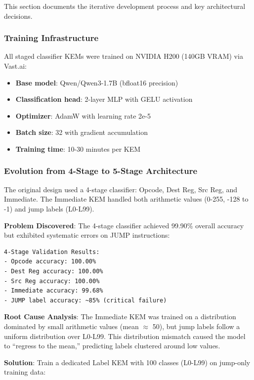 \documentclass[11pt]{article}
\begin{document}
This section documents the iterative development process and key architectural decisions.

\subsubsection{Training Infrastructure}

All staged classifier KEMs were trained on NVIDIA H200 (140GB VRAM) via Vast.ai:

\begin{itemize}
    \item \textbf{Base model}: Qwen/Qwen3-1.7B (bfloat16 precision)
    \item \textbf{Classification head}: 2-layer MLP with GELU activation
    \item \textbf{Optimizer}: AdamW with learning rate 2e-5
    \item \textbf{Batch size}: 32 with gradient accumulation
    \item \textbf{Training time}: 10-30 minutes per KEM
\end{itemize}

\subsubsection{Evolution from 4-Stage to 5-Stage Architecture}

The original design used a 4-stage classifier: Opcode, Dest Reg, Src Reg, and Immediate. The Immediate KEM handled both arithmetic values (0-255, -128 to -1) and jump labels (L0-L99).

\textbf{Problem Discovered}: The 4-stage classifier achieved 99.90\% overall accuracy but exhibited systematic errors on JUMP instructions:

\begin{lstlisting}
4-Stage Validation Results:
- Opcode accuracy: 100.00%
- Dest Reg accuracy: 100.00%
- Src Reg accuracy: 100.00%
- Immediate accuracy: 99.68%
- JUMP label accuracy: ~85% (critical failure)
\end{lstlisting}

\textbf{Root Cause Analysis}: The Immediate KEM was trained on a distribution dominated by small arithmetic values (mean $\approx$ 50), but jump labels follow a uniform distribution over L0-L99. This distribution mismatch caused the model to ``regress to the mean,'' predicting labels clustered around low values.

\textbf{Solution}: Train a dedicated Label KEM with 100 classes (L0-L99) on jump-only training data:
\end{document}
